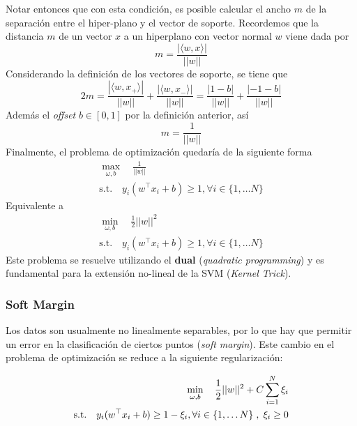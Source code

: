 Notar entonces que con esta condición, es posible calcular el ancho $m$ de la separación entre el hiper-plano y el vector de soporte. Recordemos que la distancia $m$ de un vector $x$ a un hiperplano con vector normal $w$ viene dada por 
$$m = \frac{|\langle w, x \rangle|}{||w||}$$
Considerando la definición de los vectores de soporte, se tiene que 
$$2m = \frac{|\langle w, x_{+} \rangle|}{||w||} + \frac{|\langle w, x_{-} \rangle|}{||w||} = \frac{|1-b|}{||w||} + \frac{|-1-b|}{||w||}$$
Además el \textit{offset} $b \in [0,1]$ por la definición anterior, así 
$$m = \frac{1}{||w||}$$
Finalmente, el problema de optimización quedaría de la siguiente forma 
\begin{equation*}
\begin{aligned}
\max_{\omega , b} \quad \frac{1}{||w||} \\
\textrm{s.t.} \quad y_i(w^{\top}x_i + b ) \geq 1 , \forall i \in \{ 1 , \dots N \}
\end{aligned}
\end{equation*}
Equivalente a 
\begin{equation*}
\begin{aligned}
\min_{\omega , b} \quad \frac{1}{2}||w||^2 \\
\textrm{s.t.} \quad y_i(w^{\top}x_i + b ) \geq 1 , \forall i \in \{ 1 , \dots N \}
\end{aligned}
\end{equation*}
Este problema se resuelve utilizando el \textbf{dual} (\textit{quadratic programming}) y es fundamental para la extensión no-lineal de la SVM (\textit{Kernel Trick}). 

\subsubsection{Soft Margin}

Los datos son usualmente no linealmente separables, por lo que hay que permitir un error en la clasificación de ciertos puntos (\textit{soft margin}). Este cambio en el problema de optimización se reduce a la siguiente regularización:

\begin{equation*}
\begin{aligned}
\min_{\omega , b} \quad \frac{1}{2}||w||^2 + C \sum_{i=1}^N \xi_i  \\
\textrm{s.t.} \quad y_i(w^{\top}x_i + b ) \geq 1  - \xi_i, \forall i \in \{ 1 , \dots N \} \hspace{0.1cm} ,\hspace{0.1cm} \xi_i \geq 0
\end{aligned}
\end{equation*}

